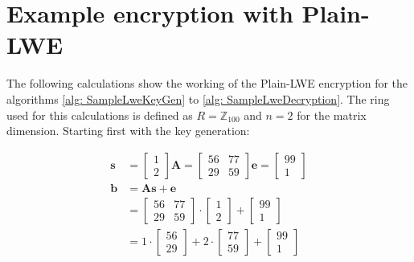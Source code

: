 \section{Example encryption with Plain-LWE}
\label{app:PlainLweCalc}
The following calculations show the working of the Plain-LWE encryption for the algorithms \ref{alg: SampleLweKeyGen} to \ref{alg: SampleLweDecryption}. The ring used for this calculations is defined as $R=\mathbb{Z}_{100}$ and $n=2$ for the matrix dimension. Starting first with the key generation:


\begin{align*}
  \textbf{s} & = \begin{bmatrix}1 \\ 2 \end{bmatrix}
  \textbf{A}  = \begin{bmatrix}56 & 77 \\ 29 & 59 \end{bmatrix}
  \textbf{e}  = \begin{bmatrix}99 \\ 1 \end{bmatrix}               \\
  \textbf{b} & = \textbf{A}\textbf{s} +\textbf{e}                  \\
             & = \begin{bmatrix}
                   56 & 77  \\
                   29 & 59
                 \end{bmatrix}
  \cdot
  \begin{bmatrix}
    1 \\
    2
  \end{bmatrix}
  +
  \begin{bmatrix}
    99 \\ 
    1 
  \end{bmatrix}
  \\
             & = 1
  \cdot
  \begin{bmatrix}
    56 \\
    29
  \end{bmatrix}
  + 2 
  \cdot
  \begin{bmatrix}
    77 \\ 
    59 
  \end{bmatrix}
  + 
  \begin{bmatrix}
    99 \\ 
    1 
  \end{bmatrix}                                                  \\

\end{align*}
